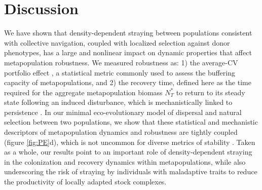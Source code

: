 \documentclass{revtex4}
\begin{document}
\section{Discussion}

We have shown that density-dependent straying between populations consistent with collective navigation, coupled with localized selection against donor phenotypes, has a large and nonlinear impact on dynamic properties that affect metapopulation robustness.
We measured robustness as:
1) the average-CV portfolio effect \citep{Anderson:2013gb,Anonymous:2015gf}, a statistical metric commonly used to assess the buffering capacity of metapopulations, and
2) the recovery time, defined here as the time required for the aggregate metapopulation biomass $N_T^*$ to return to its steady state following an induced disturbance, which is mechanistically linked to persistence \citep{Ovaskainen:2002il}.
In our minimal eco-evolutionary model of dispersal and natural selection between two populations, we show that these statistical and mechanistic descriptors of metapopulation dynamics and robustness are tightly coupled (figure \ref{fig:PE}d), which is not uncommon for diverse metrics of stability \citep{Donohue:2013iu}.
Taken as a whole, our results point to an important role of density-dependent straying in the colonization and recovery dynamics within metapopulations, while also underscoring the risk of straying by individuals with maladaptive traits to reduce the productivity of locally adapted stock complexes.

% 
% 
\end{document}
